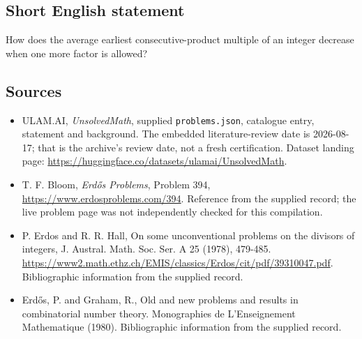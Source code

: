 \documentclass[11pt,a4paper]{article}
\begin{document}
\subsection{Short English statement}

How does the average earliest consecutive-product multiple of an integer decrease when one more factor is allowed?

\subsection{Sources}

{\small

\begin{itemize}

\item[\hypertarget{source:statement:1}{S1}] ULAM.AI, \emph{UnsolvedMath}, supplied \texttt{problems.json}, catalogue entry, statement and background. The embedded literature-review date is 2026-08-17; that is the archive’s review date, not a fresh certification. Dataset landing page: \url{https://huggingface.co/datasets/ulamai/UnsolvedMath}.

\item[\hypertarget{source:statement:2}{S2}] T. F. Bloom, \emph{Erdős Problems}, Problem 394, \url{https://www.erdosproblems.com/394}. Reference from the supplied record; the live problem page was not independently checked for this compilation.

\item[\hypertarget{source:statement:3}{S3}] P. Erdos and R. R. Hall, On some unconventional problems on the divisors of integers, J. Austral. Math. Soc. Ser. A 25 (1978), 479-485. \url{https://www2.math.ethz.ch/EMIS/classics/Erdos/cit/pdf/39310047.pdf}. Bibliographic information from the supplied record.

\item[\hypertarget{source:statement:4}{S4}] Erd\H{o}s, P. and Graham, R., Old and new problems and results in combinatorial number theory. Monographies de L'Enseignement Mathematique (1980). Bibliographic information from the supplied record.

\end{itemize}

}

\label{end:statement}
\end{document}
